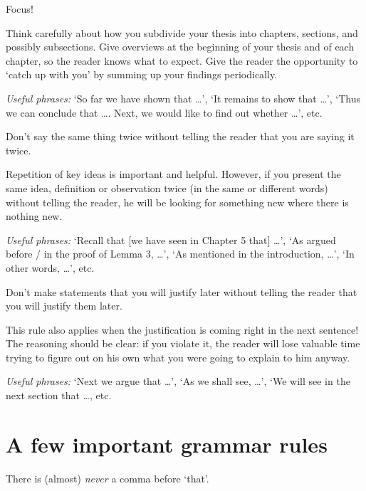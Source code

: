 \begin{Rule}
  Focus!  
\end{Rule}

Think carefully about how you subdivide your thesis into chapters,
sections, and possibly subsections.  Give overviews at the beginning
of your thesis and of each chapter, so the reader knows what to
expect. Give the reader the opportunity to `catch up with you' by
summing up your findings periodically.

\emph{Useful phrases:} `So far we have shown that \ldots', `It remains
to show that \ldots', `Thus we can conclude that
\ldots. Next, we would like to find out whether \ldots', etc.

\begin{Rule}
  Don't say the same thing twice without telling the reader that you
  are saying it twice.
\end{Rule}

Repetition of key ideas is important and helpful. However, if you
present the same idea, definition or observation twice (in the same or
different words) without telling the reader, he will be looking for
something new where there is nothing new.

\emph{Useful phrases:} `Recall that [we have seen in Chapter 5 that]
\ldots', `As argued before / in the proof of Lemma 3, \ldots', `As
mentioned in the introduction, \ldots', `In other words, \ldots', etc.

\begin{Rule}
  Don't make statements that you will justify later without telling
  the reader that you will justify them later.
\end{Rule}

This rule also applies when the justification is coming right in the
next sentence!  The reasoning should be clear: if you violate it, the
reader will lose valuable time trying to figure out on his own what
you were going to explain to him anyway.

\emph{Useful phrases:} `Next we argue that \ldots', `As we shall see,
\ldots', `We will see in the next section that \ldots, etc.


\section{A few important grammar rules}

\begin{Rule}
  \label{rule:no-comma-before-that}
  There is (almost) \emph{never} a comma before `that'.
\end{Rule}

